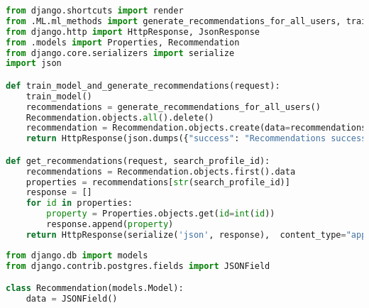 \begin{apendicesenv}
\begin{lstlisting}[language=Python, caption=API - views.py]
from django.shortcuts import render
from .ML.ml_methods import generate_recommendations_for_all_users, train_model
from django.http import HttpResponse, JsonResponse
from .models import Properties, Recommendation
from django.core.serializers import serialize
import json

def train_model_and_generate_recommendations(request):
    train_model()
    recommendations = generate_recommendations_for_all_users()
    Recommendation.objects.all().delete()
    recommendation = Recommendation.objects.create(data=recommendations)
    return HttpResponse(json.dumps({"success": "Recommendations successfully generated!"}), content_type="application/json")

def get_recommendations(request, search_profile_id):
    recommendations = Recommendation.objects.first().data
    properties = recommendations[str(search_profile_id)]
    response = []
    for id in properties:
        property = Properties.objects.get(id=int(id))
        response.append(property)
    return HttpResponse(serialize('json', response),  content_type="application/json")
\end{lstlisting}

\begin{lstlisting}[language=Python, caption=API - models.py]
from django.db import models
from django.contrib.postgres.fields import JSONField

class Recommendation(models.Model):
    data = JSONField()


\end{lstlisting}
\end{apendicesenv}
